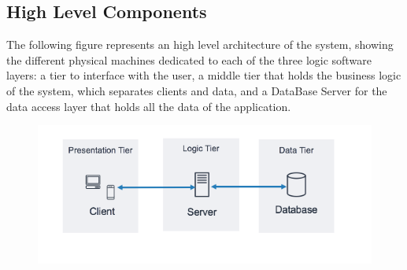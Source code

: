 \documentclass{article}
\begin{document}
\subsection{High Level Components}
The following figure represents an high level architecture of the system, showing the different physical machines dedicated to each of the three logic software layers: a tier to interface with the user, a middle tier that holds the business logic of the system, which separates clients and data, and a DataBase Server for the data access layer that holds all the data of the application. \\
\begin{figure}[H]
  \includegraphics[width=\linewidth]{threeTiers.png}
  
\end{figure}
\end{document}
